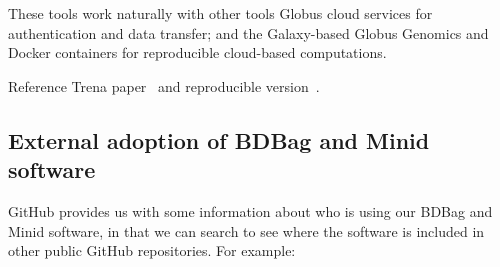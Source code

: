 \documentclass[11pt]{article}
\begin{document}
These tools work naturally with other tools
Globus cloud services for authentication and data transfer; 
and the Galaxy-based Globus Genomics and Docker containers for reproducible cloud-based computations. 

Reference Trena paper~\cite{funk18} and reproducible version~\cite{madduri2018reproducible}.


\subsection{External adoption of BDBag and Minid software}

GitHub provides us with some information about who is using our BDBag and Minid software,
in that we can search to see where the software is included in other public GitHub repositories. 
For example:
\end{document}
